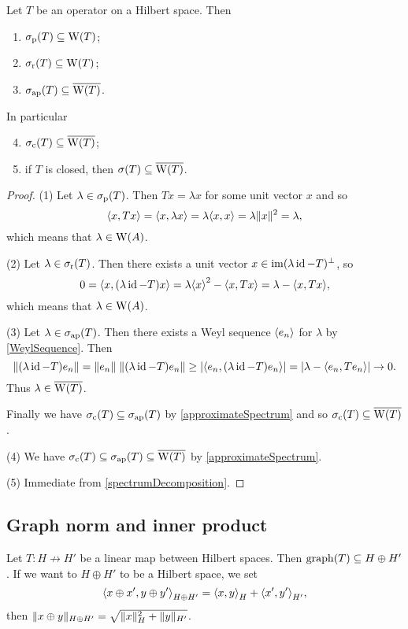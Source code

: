 \begin{proposition} \label{spectralInclusionNumericalRange}
Let $T$ be an operator on a Hilbert space. Then
\begin{enumerate}
\item $\sigma_\text{p}(T)\subseteq \operatorname{W}(T)$;
\item $\sigma_\text{r}(T) \subseteq \operatorname{W}(T)$;
\item $\sigma_\text{ap}(T) \subseteq \overline{\operatorname{W}(T)}$.
\end{enumerate}
In particular
\begin{enumerate} \setcounter{enumi}{3}
\item $\sigma_\text{c}(T) \subseteq \overline{\operatorname{W}(T)}$;
\item if $T$ is closed, then $\sigma(T) \subseteq \overline{\operatorname{W}(T)}$.
\end{enumerate}
\end{proposition}
\begin{proof}
(1) Let $\lambda \in \sigma_\text{p}(T)$. Then $Tx = \lambda x$ for some unit vector $x$ and so
\[ \inner{x,Tx} = \inner{x,\lambda x} = \lambda \inner{x,x} = \lambda\norm{x}^2 = \lambda, \]
which means that $\lambda \in \operatorname{W}(A)$.

(2) Let $\lambda \in \sigma_\text{r}(T)$. Then there exists a unit vector $x \in \operatorname{im}(\lambda\operatorname{id} - T)^\perp$, so
\[ 0 = \inner{x,(\lambda\id-T)x} = \lambda\inner{x}^2 - \inner{x,Tx} = \lambda - \inner{x,Tx}, \]
which means that $\lambda \in \operatorname{W}(A)$.

(3) Let $\lambda \in \sigma_\text{ap}(T)$. Then there exists a Weyl sequence $\left\langle e_n \right\rangle$ for $\lambda$ by \ref{WeylSequence}. Then
\[ \norm{(\lambda\id - T)e_n} = \norm{e_n}\;\norm{(\lambda\id - T)e_n} \geq |\inner{e_n, (\lambda\id - T)e_n}| = |\lambda - \inner{e_n,Te_n}| \to 0. \]
Thus $\lambda\in\overline{\operatorname{W}(T)}$.

Finally we have $\sigma_\text{c}(T)\subseteq\sigma_\text{ap}(T)$ by \ref{approximateSpectrum} and so $\sigma_\text{c}(T)\subseteq\overline{\operatorname{W}(T)}$.

(4) We have $\sigma_\text{c}(T) \subseteq \sigma_\text{ap}(T) \subseteq \overline{\operatorname{W}(T)}$ by \ref{approximateSpectrum}.

(5) Immediate from \ref{spectrumDecomposition}.
\end{proof}

\subsection{Graph norm and inner product}
Let $T: H\not\to H'$ be a linear map between Hilbert spaces. Then $\operatorname{graph}(T)\subseteq H\oplus H'$. If we want to $H\oplus H'$ to be a Hilbert space, we set
\[ \inner{x\oplus x', y\oplus y'}_{H\oplus H'} = \inner{x,y}_H + \inner{x',y'}_{H'}, \]
then $\lVert x\oplus y\rVert_{H\oplus H'} = \sqrt{\lVert x\rVert_H^2 + \lVert y\rVert_{H'}}$.

